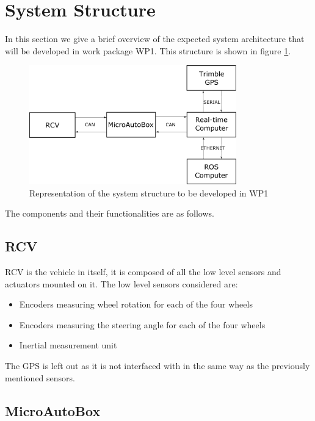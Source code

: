 \section{System Structure}

\label{sec:system_structure_appendix}

In this section we give a brief overview of the expected system architecture that will be developed in work package WP1. This structure is shown in figure \ref{fig:system_structure}.

\begin{figure}[h!]
  \centering
    \includegraphics[width=0.8\textwidth]{SystemStructureWithCommunicationProtocols}
    \caption{Representation of the system structure to be developed in WP1 \label{fig:system_structure} }
\end{figure}

The components and their functionalities are as follows.

\subsection{RCV} 

RCV is the vehicle in itself, it is composed of all the low level sensors and actuators mounted on it. The low level sensors considered are:

\begin{itemize}
\item Encoders measuring wheel rotation for each of the four wheels
\item Encoders measuring the steering angle for each of the four wheels
\item Inertial measurement unit
\end{itemize}

The GPS is left out as it is not interfaced with in the same way as the previously mentioned sensors.

\subsection{MicroAutoBox}

